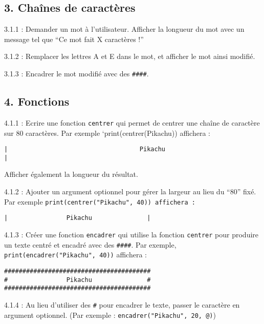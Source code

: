 \documentclass[]{article}
\begin{document}
\hypertarget{chauxeenes-de-caractuxe8res}{%
\subsection{3. Chaînes de
caractères}\label{chauxeenes-de-caractuxe8res}}

3.1.1 : Demander un mot à l'utilisateur. Afficher la longueur du mot
avec un message tel que ``Ce mot fait X caractères !''

3.1.2 : Remplacer les lettres A et E dans le mot, et afficher le mot
ainsi modifié.

3.1.3 : Encadrer le mot modifié avec des \texttt{\#\#\#\#}.

\hypertarget{fonctions}{%
\subsection{4. Fonctions}\label{fonctions}}

4.1.1 : Ecrire une fonction \texttt{centrer} qui permet de centrer une
chaîne de caractère sur 80 caractères. Par exemple
`print(centrer(Pikachu)) affichera :

\begin{verbatim}
|                                    Pikachu                                  |
\end{verbatim}

Afficher également la longueur du résultat.

4.1.2 : Ajouter un argument optionnel pour gérer la largeur au lieu du
``80'' fixé. Par exemple
\texttt{print(centrer("Pikachu",\ 40))\ affichera\ :}

\begin{verbatim}
|                Pikachu               |
\end{verbatim}

4.1.3 : Créer une fonction \texttt{encadrer} qui utilise la fonction
\texttt{centrer} pour produire un texte centré et encadré avec des
\texttt{\#\#\#\#}. Par exemple, \texttt{print(encadrer("Pikachu",\ 40))}
affichera :

\begin{verbatim}
########################################
#                Pikachu               #
########################################
\end{verbatim}

4.1.4 : Au lieu d'utiliser des \texttt{\#} pour encadrer le texte,
passer le caractère en argument optionnel. (Par exemple :
\texttt{encadrer("Pikachu",\ 20,\ \textquotesingle{}@\textquotesingle{})})
\end{document}
